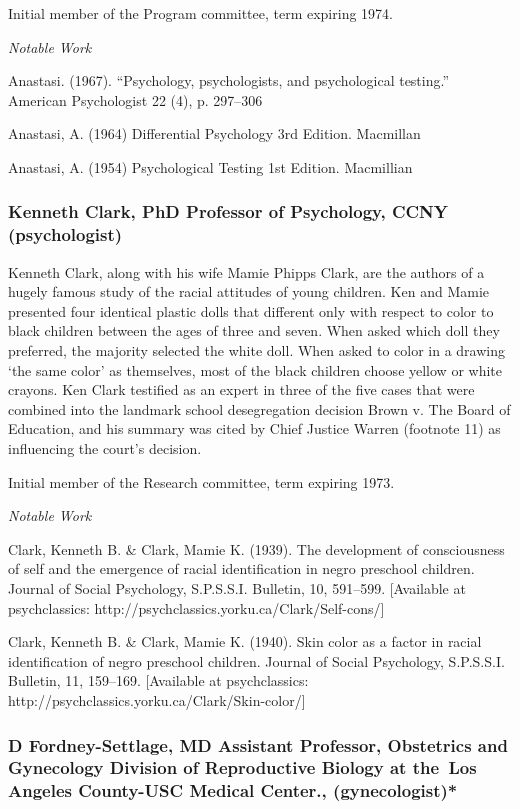 \begin{refsection}
Initial member of the Program committee, term expiring 1974.

\emph{Notable Work}

Anastasi. (1967). “Psychology, psychologists, and psychological testing.” American Psychologist 22 (4), p. 297--306

Anastasi, A. (1964) Differential Psychology 3rd Edition. Macmillan

Anastasi, A. (1954) Psychological Testing 1st Edition. Macmillian

\subsubsection{Kenneth Clark, PhD Professor of Psychology, CCNY (psychologist)}
\label{kennethclarkphdprofessorofpsychologyccnypsychologist}

Kenneth Clark, along with his wife Mamie Phipps Clark, are the authors of a hugely famous study of the racial attitudes of young children. Ken and Mamie presented four identical plastic dolls that different only with respect to color to black children between the ages of three and seven. When asked which doll they preferred, the majority selected the white doll. When asked to color in a drawing `the same color' as themselves, most of the black children choose yellow or white crayons. Ken Clark testified as an expert in three of the five cases that were combined into the landmark school desegregation decision Brown v. The Board of Education, and his summary was cited by Chief Justice Warren (footnote 11) as influencing the court's decision.

Initial member of the Research committee, term expiring 1973.

\emph{Notable Work}

Clark, Kenneth B. \& Clark, Mamie K. (1939). The development of consciousness of self and the emergence of racial identification in negro preschool children. Journal of Social Psychology, S.P.S.S.I. Bulletin, 10, 591--599. [Available at psychclassics: http:\slash \slash psychclassics.yorku.ca\slash Clark\slash Self-cons\slash ]

Clark, Kenneth B. \& Clark, Mamie K. (1940). Skin color as a factor in racial identification of negro preschool children. Journal of Social Psychology, S.P.S.S.I. Bulletin, 11, 159--169. [Available at psychclassics: http:\slash \slash psychclassics.yorku.ca\slash Clark\slash Skin-color\slash ]

\subsubsection{D Fordney-Settlage, MD Assistant Professor, Obstetrics and Gynecology Division of Reproductive Biology at the Los Angeles County-USC Medical Center., (gynecologist)*}
\label{dfordney-settlagemdassistantprofessorobstetricsandgynecologydivisionofreproductivebiologyatthe losangelescounty-uscmedicalcenter.gynecologist}


\end{refsection}
